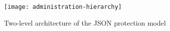  
 	\begin{figure} [t]
 		\centering
 		\texttt{[image: administration-hierarchy]}
 		\caption{Two-level architecture of the JSON protection model}
 		\label{fig:administration-hierarchy}
 	\end{figure}
 
